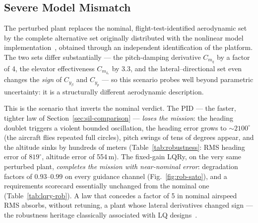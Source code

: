 \begin{table}[!t]
\caption{LQRy requirements scorecard across the robustness scenarios
(mission reference events, $\VT$/$\psi$/$h$). The nominal row repeats
Table~\ref{tab:compliance}.}
\label{tab:lqry-rob}
\centering
{}
\end{table}

\subsection{Severe Model Mismatch}
\label{sec:rob-sato}
The perturbed plant replaces the nominal, flight-test-identified
aerodynamic set~\cite{angelo2026} by the complete alternative set
originally distributed with the nonlinear model
implementation~\cite{ferreira2019modeling,repo}, obtained through an
independent identification of the platform. The two sets differ
substantially --- the pitch-damping derivative $C_{m_q}$ by a factor of
4, the elevator effectiveness $C_{m_{\delta_e}}$ by 3.3, and the
lateral--directional set even changes the \emph{sign} of $C_{y_\beta}$
and $C_{y_p}$ --- so this scenario probes well beyond parametric
uncertainty: it is a structurally different aerodynamic description.

This is the scenario that inverts the nominal verdict. The PID ---
the faster, tighter law of Section~\ref{sec:sil-comparison} ---
\emph{loses the mission}: the heading doublet triggers a violent
bounded oscillation, the heading error grows to ${\sim}2100^\circ$
(the aircraft flies repeated full circles), pitch swings of tens of
degrees appear, and the altitude sinks by hundreds of meters
(Table~\ref{tab:robustness}: RMS heading error of $819^\circ$,
altitude error of 554\,m). The fixed-gain LQRy, on the very same
perturbed plant, \emph{completes the mission with near-nominal error}:
degradation factors of $0.93$--$0.99$ on every guidance channel
(Fig.~\ref{fig:rob-sato}), and a requirements scorecard essentially
unchanged from the nominal one (Table~\ref{tab:lqry-rob}). A law that
concedes a factor of 5 in nominal airspeed RMS absorbs, without
retuning, a plant whose lateral derivatives changed sign --- the
robustness heritage classically associated with LQ
designs~\cite{safonov1977gain}.

